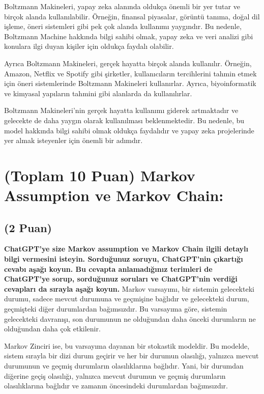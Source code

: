\documentclass[11pt]{article}
\begin{document}
Boltzmann Makineleri, yapay zeka alanında oldukça önemli bir yer tutar ve birçok alanda kullanılabilir. Örneğin, finansal piyasalar, görüntü tanıma, doğal dil işleme, öneri sistemleri gibi pek çok alanda kullanımı yaygındır. Bu nedenle, Boltzmann Machine hakkında bilgi sahibi olmak, yapay zeka ve veri analizi gibi konulara ilgi duyan kişiler için oldukça faydalı olabilir.

Ayrıca Boltzmann Makineleri, gerçek hayatta birçok alanda kullanılır. Örneğin, Amazon, Netflix ve Spotify gibi şirketler, kullanıcıların tercihlerini tahmin etmek için öneri sistemlerinde Boltzmann Makineleri kullanırlar. Ayrıca, biyoinformatik ve kimyasal yapıların tahmini gibi alanlarda da kullanılırlar.

Boltzmann Makineleri'nin gerçek hayatta kullanımı giderek artmaktadır ve gelecekte de daha yaygın olarak kullanılması beklenmektedir. Bu nedenle, bu model hakkında bilgi sahibi olmak oldukça faydalıdır ve yapay zeka projelerinde yer almak isteyenler için önemli bir adımdır.



\section{(Toplam 10 Puan) Markov Assumption ve Markov Chain:}

\subsection{(2 Puan)} \textbf{ChatGPT’ye size Markov assumption ve Markov Chain ilgili detaylı bilgi vermesini isteyin. Sorduğunuz soruyu, ChatGPT'nin çıkartığı cevabı aşağı koyun. Bu cevapta anlamadığınız terimleri de ChatGPT’ye sorup, sorduğunuz soruları ve ChatGPT’nin verdiği cevapları da sırayla aşağı koyun.}
Markov varsayımı, bir sistemin gelecekteki durumu, sadece mevcut durumuna ve geçmişine bağlıdır ve gelecekteki durum, geçmişteki diğer durumlardan bağımsızdır. Bu varsayıma göre, sistemin gelecekteki davranışı, son durumunun ne olduğundan daha önceki durumların ne olduğundan daha çok etkilenir.

Markov Zinciri ise, bu varsayıma dayanan bir stokastik modeldir. Bu modelde, sistem sırayla bir dizi durum geçirir ve her bir durumun olasılığı, yalnızca mevcut durumunun ve geçmiş durumların olasılıklarına bağlıdır. Yani, bir durumdan diğerine geçiş olasılığı, yalnızca mevcut durumun ve geçmiş durumların olasılıklarına bağlıdır ve zamanın öncesindeki durumlardan bağımsızdır.
\end{document}
